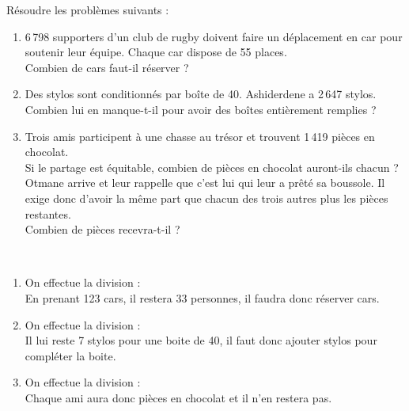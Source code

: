 \begin{colonne*exercice}
\bigskip


\begin{exercice} %
   Résoudre les problèmes suivants :
   \begin{enumerate}
      \item 6\,798 supporters d'un club de rugby doivent faire un déplacement en car pour soutenir leur équipe. Chaque car dispose de 55 places. \\
        Combien de cars faut-il réserver ?
      \item Des stylos sont conditionnés par boîte de 40. Ashiderdene a 2\,647 stylos. \\
         Combien lui en manque-t-il pour avoir des boîtes entièrement remplies ?
      \item Trois amis participent à une chasse au trésor et trouvent 1\,419 pièces en chocolat. \\
      Si le partage est équitable, combien de pièces en chocolat auront-ils chacun ? \\
      Otmane arrive et leur rappelle que c'est lui qui leur a prêté sa boussole. Il exige donc d'avoir la même part que chacun des trois autres plus les pièces restantes. \\
      Combien de pièces recevra-t-il ?
   \end{enumerate}
\end{exercice}

\begin{corrige}
   \ \\ [-5mm]
   \begin{enumerate}
      \item On effectue la division : {\small {}} \\
         En prenant 123 cars, il restera 33 personnes, il faudra donc réserver { cars}.
      \item On effectue la division : {\small {}} \\
         Il lui reste 7 stylos pour une boite de 40, il faut donc ajouter { stylos} pour compléter la boite.
      \item On effectue la division : {\small {}} \\
         Chaque ami aura donc { pièces en chocolat} et il n'en restera	pas.
   \end{enumerate}
   
\Coupe



\end{corrige}
\end{colonne*exercice}
